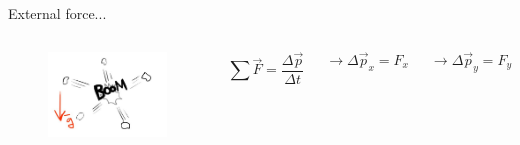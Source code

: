 \documentclass[]{beamer}
\begin{document}
                

        \begin{frame}
           External force...
            
 
            
            
              \begin{columns}[c]
                \column{2in}  %
               
                \begin{figure}[h!]  
                    \includegraphics[width=1.\textwidth]{images/4.jpg}
                  
                  \end{figure}
            
                  
                \column{2in}
             
            
          
        
            
            
            \begin{equation*}
                \sum \vec F = \frac{\Delta \vec p}{\Delta t}
            \end{equation*}
            
            \begin{equation*}
                \rightarrow \Delta \vec p_x= F_x
            \end{equation*}
            
            \begin{equation*}
                \rightarrow \Delta \vec p_y= F_y
            \end{equation*}
            
   
            
        \end{columns}




              \end{frame}
\end{document}
